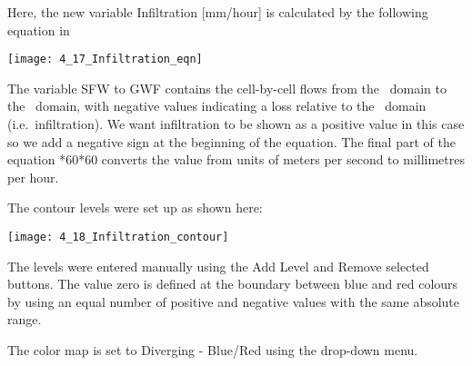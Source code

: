 Here, the new  variable {\sf Infiltration [mm/hour]} is calculated by the following equation in \tecplot\:

        \texttt{[image: 4\_17\_Infiltration\_eqn]}

The variable {\sf SFW to GWF} contains the cell-by-cell flows from the \swf\ domain to the \gwf\ domain, with negative values indicating a loss relative to the \swf\ domain (i.e.\ infiltration).  We want infiltration to be shown as a positive value in this case so we add a negative sign at the beginning of the equation.  The final part of the equation {*60*60} converts the value from units of meters per second to millimetres per hour.  

The contour levels were set up as shown here:

        \texttt{[image: 4\_18\_Infiltration\_contour]}

The levels were entered manually using the {\sf Add Level} and {\sf Remove selected} buttons.  The value zero is defined at the boundary between blue and red colours by using an equal number of positive and negative values with the same absolute range.

The color map is set to {\sf Diverging - Blue/Red} using the drop-down menu.


